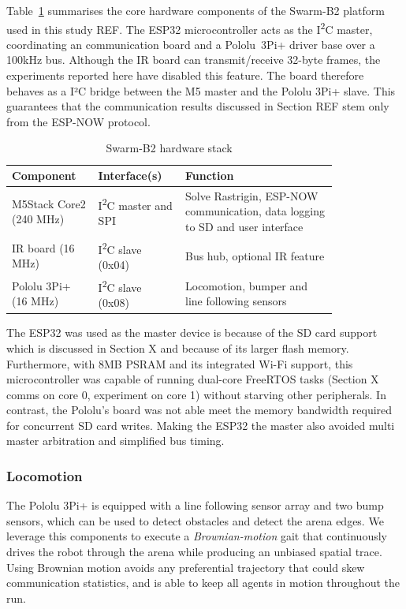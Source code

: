 \documentclass[conference]{IEEEtran}
\begin{document}
Table~\ref{tab:B2-hardware} summarises the core hardware components of the Swarm-B2 platform used in this study REF. The ESP32 microcontroller acts as the I\textsuperscript{2}C master, coordinating an communication board and a Pololu~3Pi+ driver base over a 100kHz bus. Although the IR board can transmit/receive 32-byte frames, the experiments reported here have disabled this feature. The board therefore behaves as a I²C bridge between the M5 master and the Pololu 3Pi+ slave. This guarantees that the communication results discussed in Section REF stem only from the ESP-NOW protocol.\\

\begin{table}[h]
  \centering
  \caption{Swarm-B2 hardware stack}
  \label{tab:B2-hardware}
  \begin{tabular}{p{0.20\linewidth} p{0.22\linewidth} p{0.40\linewidth}}
    \toprule
    Component & Interface(s) & Function \\
    \midrule
    M5Stack Core2 (240 MHz) & I\textsuperscript{2}C master and SPI & Solve Rastrigin, ESP-NOW communication, data logging to SD and user interface \\
    IR board (16 MHz) & I\textsuperscript{2}C slave (0x04) & Bus hub, optional IR feature \\
    Pololu 3Pi+ (16 MHz) & I\textsuperscript{2}C slave (0x08) & Locomotion, bumper and line following sensors \\

    \bottomrule
  \end{tabular}
\end{table}

The ESP32 was used as the master device is because of the SD card support which is discussed in Section X and because of its larger flash memory. Furthermore, with 8MB PSRAM and its integrated Wi-Fi support, this microcontroller was capable of running dual-core FreeRTOS tasks (Section X comms on core 0, experiment on core 1) without starving other peripherals. In contrast, the Pololu's board was not able meet the memory bandwidth required for concurrent SD card writes. Making the ESP32 the master also avoided multi master arbitration and simplified bus timing.

\subsubsection{Locomotion}

The Pololu 3Pi+ is equipped with a line following sensor array and two bump sensors, which can be used to detect obstacles and detect the arena edges. We leverage this components to execute a \emph{Brownian-motion} gait that continuously drives the robot through the arena while producing an unbiased spatial trace. Using Brownian motion avoids any preferential trajectory that could skew communication statistics, and is able to keep all agents in motion throughout the run.\\
\end{document}
